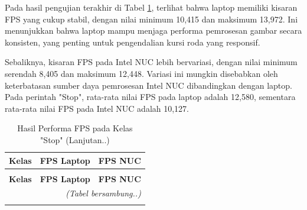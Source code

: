 Pada hasil pengujian terakhir di Tabel \ref{tb:fpsstop}, terlihat bahwa laptop memiliki kisaran FPS yang cukup stabil, dengan nilai minimum 10,415 dan maksimum 13,972. Ini menunjukkan bahwa laptop mampu menjaga performa pemrosesan gambar secara konsisten, yang penting untuk pengendalian kursi roda yang responsif.

Sebaliknya, kisaran FPS pada Intel NUC lebih bervariasi, dengan nilai minimum serendah 8,405 dan maksimum 12,448. Variasi ini mungkin disebabkan oleh keterbatasan sumber daya pemrosesan Intel NUC dibandingkan dengan laptop. Pada perintah "Stop", rata-rata nilai FPS pada laptop adalah 12,580, sementara rata-rata nilai FPS pada Intel NUC adalah 10,127.

\begin{longtable}{|c|c|c|}
  \caption{Hasil Performa FPS pada Kelas "Stop"}
  \label{tb:fpsstop} \\ 
  \hline
  \rowcolor[HTML]{C0C0C0} 
  \textbf{Kelas} & \textbf{FPS Laptop} & \textbf{FPS NUC} \\ 
  \hline
  \endfirsthead

  \caption[]{Hasil Performa FPS pada Kelas "Stop" (Lanjutan..)} \\
  \hline
  \rowcolor[HTML]{C0C0C0} 
  \textbf{Kelas} & \textbf{FPS Laptop} & \textbf{FPS NUC} \\ 
  \hline
  \endhead

  \hline
  \multicolumn{3}{r}{\textit{(Tabel bersambung..)}} \\ 
  \endfoot

  \hline
  \endlastfoot


\end{longtable}
